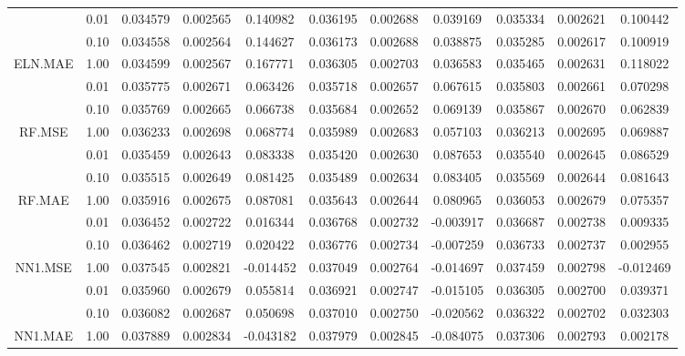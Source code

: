 \begin{longtable}{ccccccccccc}
\cmidrule{1-11}
 & 0.01 & 0.034579 & 0.002565 & 0.140982 & 0.036195 & 0.002688 & 0.039169 & 0.035334 & 0.002621 & 0.100442\\
\cmidrule{2-11}
 & 0.10 & 0.034558 & 0.002564 & 0.144627 & 0.036173 & 0.002688 & 0.038875 & 0.035285 & 0.002617 & 0.100919\\
\cmidrule{2-11}
\multirow{-3}{*}{\centering\arraybackslash ELN.MAE} & 1.00 & 0.034599 & 0.002567 & 0.167771 & 0.036305 & 0.002703 & 0.036583 & 0.035465 & 0.002631 & 0.118022\\
\cmidrule{1-11}
 & 0.01 & 0.035775 & 0.002671 & 0.063426 & 0.035718 & 0.002657 & 0.067615 & 0.035803 & 0.002661 & 0.070298\\
\cmidrule{2-11}
 & 0.10 & 0.035769 & 0.002665 & 0.066738 & 0.035684 & 0.002652 & 0.069139 & 0.035867 & 0.002670 & 0.062839\\
\cmidrule{2-11}
\multirow{-3}{*}{\centering\arraybackslash RF.MSE} & 1.00 & 0.036233 & 0.002698 & 0.068774 & 0.035989 & 0.002683 & 0.057103 & 0.036213 & 0.002695 & 0.069887\\
\cmidrule{1-11}
 & 0.01 & 0.035459 & 0.002643 & 0.083338 & 0.035420 & 0.002630 & 0.087653 & 0.035540 & 0.002645 & 0.086529\\
\cmidrule{2-11}
 & 0.10 & 0.035515 & 0.002649 & 0.081425 & 0.035489 & 0.002634 & 0.083405 & 0.035569 & 0.002644 & 0.081643\\
\cmidrule{2-11}
\multirow{-3}{*}{\centering\arraybackslash RF.MAE} & 1.00 & 0.035916 & 0.002675 & 0.087081 & 0.035643 & 0.002644 & 0.080965 & 0.036053 & 0.002679 & 0.075357\\
\cmidrule{1-11}
 & 0.01 & 0.036452 & 0.002722 & 0.016344 & 0.036768 & 0.002732 & -0.003917 & 0.036687 & 0.002738 & 0.009335\\
\cmidrule{2-11}
 & 0.10 & 0.036462 & 0.002719 & 0.020422 & 0.036776 & 0.002734 & -0.007259 & 0.036733 & 0.002737 & 0.002955\\
\cmidrule{2-11}
\multirow{-3}{*}{\centering\arraybackslash NN1.MSE} & 1.00 & 0.037545 & 0.002821 & -0.014452 & 0.037049 & 0.002764 & -0.014697 & 0.037459 & 0.002798 & -0.012469\\
\cmidrule{1-11}
 & 0.01 & 0.035960 & 0.002679 & 0.055814 & 0.036921 & 0.002747 & -0.015105 & 0.036305 & 0.002700 & 0.039371\\
\cmidrule{2-11}
 & 0.10 & 0.036082 & 0.002687 & 0.050698 & 0.037010 & 0.002750 & -0.020562 & 0.036322 & 0.002702 & 0.032303\\
\cmidrule{2-11}
\multirow{-3}{*}{\centering\arraybackslash NN1.MAE} & 1.00 & 0.037889 & 0.002834 & -0.043182 & 0.037979 & 0.002845 & -0.084075 & 0.037306 & 0.002793 & 0.002178\\

\end{longtable}

